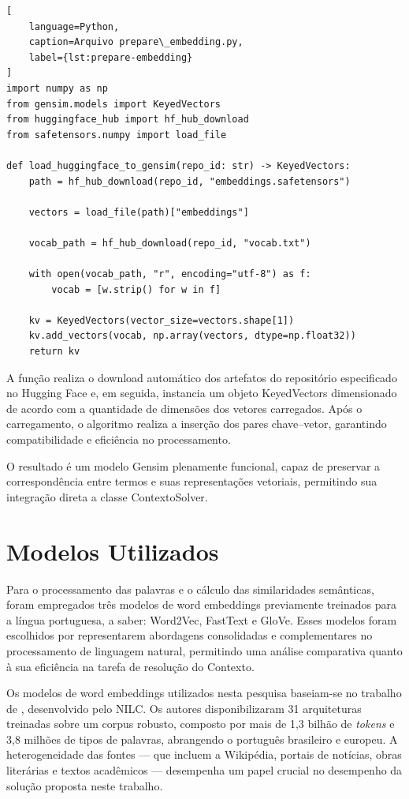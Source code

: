 \begin{lstlisting}[
    language=Python,
    caption=Arquivo prepare\_embedding.py,
    label={lst:prepare-embedding}
]
import numpy as np
from gensim.models import KeyedVectors
from huggingface_hub import hf_hub_download
from safetensors.numpy import load_file

def load_huggingface_to_gensim(repo_id: str) -> KeyedVectors:
    path = hf_hub_download(repo_id, "embeddings.safetensors")

    vectors = load_file(path)["embeddings"]
    
    vocab_path = hf_hub_download(repo_id, "vocab.txt")
    
    with open(vocab_path, "r", encoding="utf-8") as f:
        vocab = [w.strip() for w in f]

    kv = KeyedVectors(vector_size=vectors.shape[1])
    kv.add_vectors(vocab, np.array(vectors, dtype=np.float32))
    return kv
\end{lstlisting}

A função realiza o download automático dos artefatos do repositório especificado no Hugging Face e, em seguida, instancia um objeto KeyedVectors dimensionado de acordo com a quantidade de dimensões dos vetores carregados. Após o carregamento, o algoritmo realiza a inserção dos pares chave–vetor, garantindo compatibilidade e eficiência no processamento.

O resultado é um modelo Gensim plenamente funcional, capaz de preservar a correspondência entre termos e suas representações vetoriais, permitindo sua integração direta a classe ContextoSolver.

\section{Modelos Utilizados}
Para o processamento das palavras e o cálculo das similaridades semânticas, foram empregados três modelos de word embeddings previamente treinados para a língua portuguesa, a saber: Word2Vec, FastText e GloVe. Esses modelos foram escolhidos por representarem abordagens consolidadas e complementares no processamento de linguagem natural, permitindo uma análise comparativa quanto à sua eficiência na tarefa de resolução do Contexto.

Os modelos de word embeddings utilizados nesta pesquisa baseiam-se no trabalho de , desenvolvido pelo NILC. Os autores disponibilizaram 31 arquiteturas treinadas sobre um corpus robusto, composto por mais de 1,3 bilhão de \textit{tokens} e 3,8 milhões de tipos de palavras, abrangendo o português brasileiro e europeu. A heterogeneidade das fontes — que incluem a Wikipédia, portais de notícias, obras literárias e textos acadêmicos — desempenha um papel crucial no desempenho da solução proposta neste trabalho.

